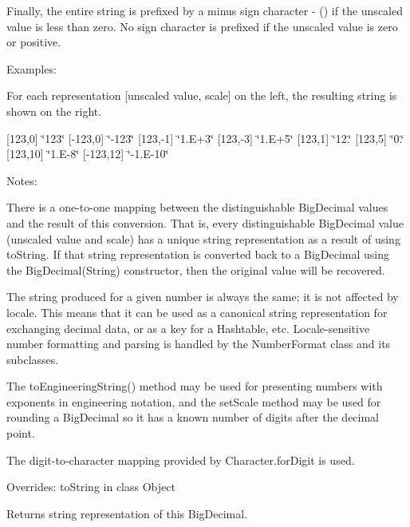 Finally, the entire string is prefixed by a minus sign character \textquotesingle{}-\/\textquotesingle{} (\textquotesingle{}\textquotesingle{}) if the unscaled value is less than zero. No sign character is prefixed if the unscaled value is zero or positive. 

Examples\+: 

For each representation \mbox{[}unscaled value, scale\mbox{]} on the left, the resulting string is shown on the right. 

\mbox{[}123,0\mbox{]} \char`\"{}123\char`\"{} \mbox{[}-\/123,0\mbox{]} \char`\"{}-\/123\char`\"{} \mbox{[}123,-\/1\mbox{]} \char`\"{}1.\+E+3\char`\"{} \mbox{[}123,-\/3\mbox{]} \char`\"{}1.\+E+5\char`\"{} \mbox{[}123,1\mbox{]} \char`\"{}12.\char`\"{} \mbox{[}123,5\mbox{]} \char`\"{}0.\char`\"{} \mbox{[}123,10\mbox{]} \char`\"{}1.\+E-\/8\char`\"{} \mbox{[}-\/123,12\mbox{]} \char`\"{}-\/1.\+E-\/10\char`\"{} 

Notes\+: 

There is a one-\/to-\/one mapping between the distinguishable Big\+Decimal values and the result of this conversion. That is, every distinguishable Big\+Decimal value (unscaled value and scale) has a unique string representation as a result of using to\+String. If that string representation is converted back to a Big\+Decimal using the Big\+Decimal(\+String) constructor, then the original value will be recovered. 

The string produced for a given number is always the same; it is not affected by locale. This means that it can be used as a canonical string representation for exchanging decimal data, or as a key for a Hashtable, etc. Locale-\/sensitive number formatting and parsing is handled by the Number\+Format class and its subclasses. 

The to\+Engineering\+String() method may be used for presenting numbers with exponents in engineering notation, and the set\+Scale method may be used for rounding a Big\+Decimal so it has a known number of digits after the decimal point. 

The digit-\/to-\/character mapping provided by Character.\+for\+Digit is used. 

Overrides\+: to\+String in class Object

\begin{DoxyReturn}{Returns}
string representation of this Big\+Decimal. 
\end{DoxyReturn}
\mbox{\label{classcom_1_1aarrelaakso_1_1drawl_1_1_sisu_big_decimal_aa50e4eab549ecda56977c2480674055b}} 
